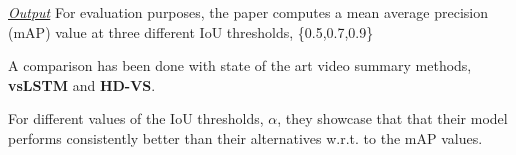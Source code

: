     	\textit{\underline{Output}}
    		For evaluation purposes, the paper computes a mean average precision (mAP) value at three different IoU thresholds, \{0.5,0.7,0.9\}
    		
    		A comparison has been done with state of the art video summary methods, \textbf{vsLSTM} and \textbf{HD-VS}.
    		
    		For different values of the IoU thresholds, \(\alpha\), they showcase that that their model performs consistently better than their alternatives w.r.t. to the mAP values.\cite[Page 8]{yang_2019_trunet}
    		
    			
        
        
        
        
		
    	
    	
    		
    		
    		
    		